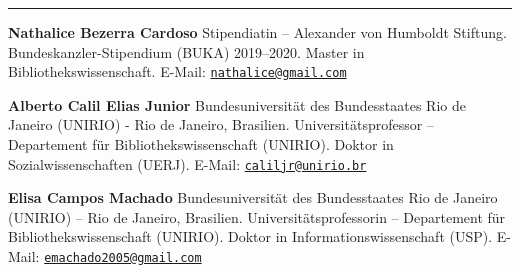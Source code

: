 \begin{center}\rule{0.5\linewidth}{0.5pt}\end{center}

\textbf{Nathalice Bezerra Cardoso} Stipendiatin -- Alexander von
Humboldt Stiftung. Bundeskanzler-Stipendium (BUKA) 2019--2020. Master in
Bibliothekswissenschaft. E-Mail:
\href{mailto:nathalice@gmail.com}{\nolinkurl{nathalice@gmail.com}}

\textbf{Alberto Calil Elias Junior} Bundesuniversität des Bundesstaates
Rio de Janeiro (UNIRIO) - Rio de Janeiro, Brasilien.
Universitätsprofessor -- Departement für Bibliothekswissenschaft
(UNIRIO). Doktor in Sozialwissenschaften (UERJ). E-Mail:
\href{mailto:caliljr@unirio.br}{\nolinkurl{caliljr@unirio.br}}

\textbf{Elisa Campos Machado} Bundesuniversität des Bundesstaates Rio de
Janeiro (UNIRIO) -- Rio de Janeiro, Brasilien. Universitätsprofessorin
-- Departement für Bibliothekswissenschaft (UNIRIO). Doktor in
Informationswissenschaft (USP). E-Mail:
\href{mailto:emachado2005@gmail.com}{\nolinkurl{emachado2005@gmail.com}}
